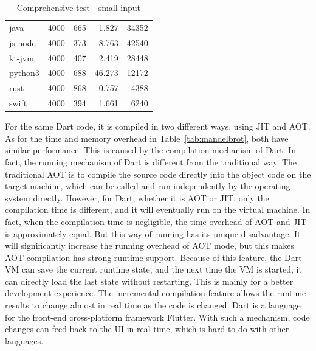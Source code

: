\begin{table}[htbp]
\begin{subtable}[h]{0.495\linewidth}
\begin{tabular}{lrrrr}
            java      & 4000 & 665     & 1.827  & 34352   \\
            js-node   & 4000 & 373     & 8.763  & 42540   \\
            kt-jvm    & 4000 & 407     & 2.419  & 28448   \\
            python3   & 4000 & 688     & 46.273 & 12172   \\
            rust      & 4000 & 868     & 0.757  & 4388    \\
            swift     & 4000 & 394     & 1.661  & 6240    \\
            \bottomrule
        \end{tabular}
        \caption{Comprehensive test - small input}
        \label{tab:mandelbrot-2}
    \end{subtable}
\end{table}

For the same Dart code, it is compiled in two different ways,
using JIT and AOT. As for the time and memory overhead in Table~\ref{tab:mandelbrot},
both have similar performance. This is caused by the compilation mechanism of Dart. In fact, the running mechanism of Dart is different from the traditional way. The traditional AOT is to compile the source code directly into the object code on the target machine, which can be called and run independently by the operating system directly. However, for Dart, whether it is AOT or JIT, only the compilation time is different, and it will eventually run on the virtual machine. In fact, when the compilation time is negligible, the time overhead of AOT and JIT is approximately equal. But this way of running has its unique disadvantage. It will significantly increase the running overhead of AOT mode, but this makes AOT compilation has strong runtime support. Because of this feature, the Dart VM can save the current runtime state, and the next time the VM is started, it can directly load the last state without restarting. This is mainly for a better development experience. The incremental compilation feature allows the runtime results to change almost in real time as the code is changed. Dart is a language for the front-end cross-platform framework Flutter. With such a mechanism, code changes can feed back to the UI in real-time, which is hard to do with other languages.

